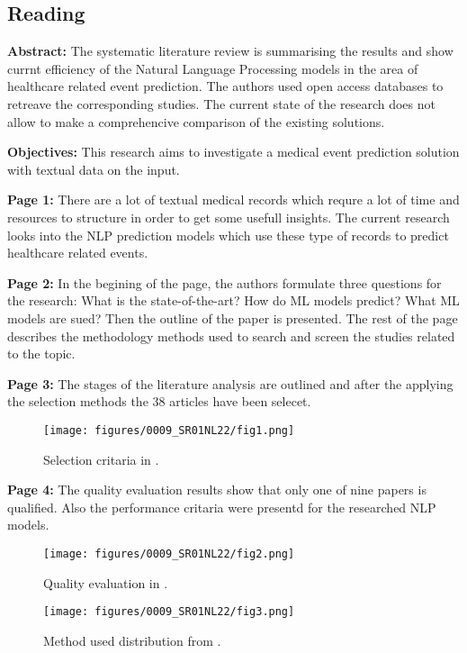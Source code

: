 \subsection{Reading}
    \textbf{Abstract:}
    The systematic literature review is summarising the results and show currnt efficiency of the Natural Language Processing models in the area of healthcare related event prediction. The authors used open access databases to retreave the corresponding studies. The current state of the research does not allow to make a comprehencive comparison of the existing solutions.
    
    \textbf{Objectives:}
    This research aims to investigate a medical event prediction solution with textual data on the input.

    \textbf{Page 1:}
    There are a lot of textual medical records which requre a lot of time and resources to structure in order to get some usefull insights. The current research looks into the NLP prediction models which use these type of records to predict healthcare related events.    
    
    \textbf{Page 2:}
    In the begining of the page, the authors formulate three questions for the research: What is the state-of-the-art? How do ML models predict? What ML models are sued? Then the outline of the paper is presented. The rest of the page describes the methodology methods used to search and screen the studies related to the topic.

    \textbf{Page 3:}
    The stages of the literature analysis are outlined and after the applying the selection methods the 38 articles have been selecet.
    \begin{figure}[H]
        \centering
        \texttt{[image: figures/0009\_SR01NL22/fig1.png]}
        \caption{Selection critaria in \cite{x349}.}
        \label{fig1:0009_SR01ES23}
    \end{figure}

    \textbf{Page 4:}
    The quality evaluation results show that only one of nine papers is qualified. Also the performance critaria were presentd for the researched NLP models. 
    \begin{figure}[H]
        \centering
        \texttt{[image: figures/0009\_SR01NL22/fig2.png]}
        \caption{Quality evaluation in \cite{x349}.}
        \label{fig2:0009_SR01ES23}
    \end{figure}
    \begin{figure}[H]
        \centering
        \texttt{[image: figures/0009\_SR01NL22/fig3.png]}
        \caption{Method used distribution from \cite{x349}.}
        \label{fig3:0009_SR01ES23}
    \end{figure}


